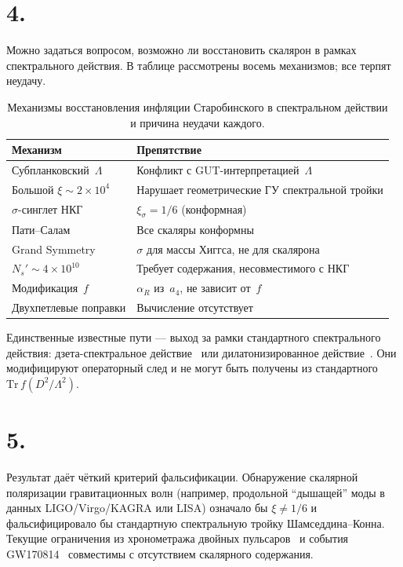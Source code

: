 \documentclass[twocolumn,10pt]{article}
\begin{document}
\section*{4.}
Можно задаться вопросом, возможно ли восстановить скалярон
в рамках спектрального действия. В таблице рассмотрены
восемь механизмов; все терпят неудачу.

\begin{table}[ht]
\centering
\caption{Механизмы восстановления инфляции Старобинского
  в спектральном действии и причина неудачи каждого.}
\label{tab:escape}
\begin{tabular}{p{3.5cm}p{4.8cm}}
\toprule
Механизм & Препятствие \\
\midrule
Субпланковский~$\Lambda$ &
  Конфликт с GUT-интерпретацией~$\Lambda$ \\
Большой $\xi \sim 2 \times 10^4$ &
  Нарушает геометрические ГУ спектральной тройки \\
$\sigma$-синглет НКГ~\cite{BFS:2010} &
  $\xi_\sigma = 1/6$ (конформная) \\
Пати--Салам~\cite{CCS:2013ps} &
  Все скаляры конформны \\
Grand Symmetry~\cite{CCS:2013gs} &
  $\sigma$ для массы Хиггса, не для скалярона \\
$N_s' \sim 4{\times}10^{10}$ &
  Требует содержания, несовместимого с НКГ \\
Модификация~$f$ &
  $\alpha_R$ из~$a_4$, не зависит от~$f$ \\
Двухпетлевые поправки &
  Вычисление отсутствует \\
\bottomrule
\end{tabular}
\end{table}

Единственные известные пути --- выход за рамки стандартного
спектрального действия: дзета-спектральное
действие~\cite{KLV:2015} или дилатонизированное
действие~\cite{CC:2006dilaton}. Они модифицируют операторный
след и не могут быть получены из стандартного
$\mathrm{Tr}\,f(D^2/\Lambda^2)$.

\section*{5.}
Результат даёт чёткий критерий фальсификации. Обнаружение
скалярной поляризации гравитационных волн (например, продольной
``дышащей'' моды в данных LIGO/Virgo/KAGRA или LISA) означало бы
$\xi \neq 1/6$ и фальсифицировало бы стандартную спектральную
тройку Шамседдина--Конна. Текущие ограничения из хронометража
двойных пульсаров~\cite{Stairs:2003} и события
GW170814~\cite{GW170814:2017} совместимы с отсутствием скалярного
содержания.
\end{document}
